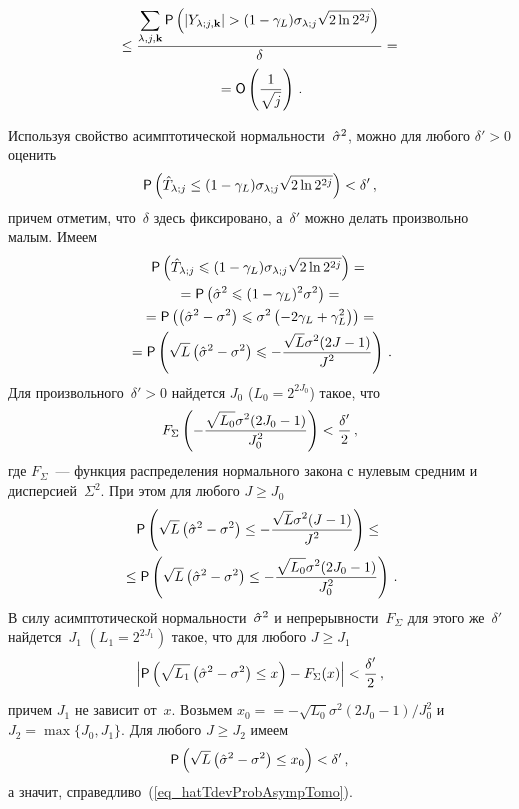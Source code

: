 \begin{multicols}{2}
\noindent
\begin{multline*}
{}\leq \displaystyle\frac{\displaystyle  \sum\limits_{\lambda,j,\mathbf{k}} {\sf P}\left( |Y_{\lambda;j,\mathbf{k}}| > (1-\gamma_L)\sigma_{\lambda;j}\sqrt{2\ln 2^{2j}} \right) \mathstrut}{\displaystyle \delta\mathstrut} = {}\\
{}=\textsf{O}\left( \displaystyle\frac{\displaystyle 1\mathstrut}{\displaystyle \sqrt{j}\mathstrut} \right)\,.
\end{multline*}

Используя свойство асимптотической нормальности~$\hat\sigma^2$, можно для любого $\delta'>0$ оценить
\begin{equation}
\label{eq_hatTdevProbAsympTomo}
{\sf P}\left( \hat T_{\lambda;j} \leq (1-\gamma_L)\sigma_{\lambda;j}\sqrt{2\ln 2^{2j}} \right)< \delta'\,,
\end{equation}
причем отметим, что~$\delta$ здесь фиксировано, а~$\delta'$ можно делать произвольно малым. Имеем
\begin{multline*}
{\sf P}\left(\hat T_{\lambda;j}\leqslant(1-\gamma_L)\sigma_{\lambda;j}\sqrt{2\ln 2^{2j}}\right) ={}\\
{}= {\sf P}\left(\hat\sigma^2\leqslant(1-\gamma_L)^2\sigma^2\right)={}\\
{}= {\sf P}\left( \left(\hat\sigma^2-\sigma^2\right) \leqslant \sigma^2\left(-2\gamma_L+\gamma_L^2\right) \right) ={}\\
{}= {\sf P}\left( \sqrt{L}\left(\hat\sigma^2-\sigma^2\right) \leqslant -\displaystyle\frac{\displaystyle \sqrt{L}\sigma^2(2J-1)\mathstrut}{\displaystyle J^2\mathstrut} \right)\,.
\end{multline*}
Для произвольного~$\delta'>0$ найдется $J_0$ ($L_0=2^{2J_0}$) такое, что
\begin{equation*}
F_\Sigma\left( -\displaystyle\frac{\displaystyle \sqrt{L_0}\sigma^2(2J_0-1 )\mathstrut}{\displaystyle J_0^2\mathstrut} \right) < \displaystyle\frac{\displaystyle \delta'\mathstrut}{\displaystyle 2\mathstrut}\,,
\end{equation*}
где $F_\Sigma$~--- функция распределения нормального закона с нулевым средним и дисперсией~$\Sigma^2$. 
При этом для любого $J\geq J_0$
\begin{multline*}
{\sf P}\left( \sqrt{L}\left(\hat\sigma^2-\sigma^2\right) \leq -\displaystyle\frac{\displaystyle \sqrt{L}\sigma^2(J -1 )\mathstrut}{\displaystyle J^2\mathstrut} \right) \leq{} \\
{}\leq {\sf P}\left( \sqrt{L}\left(\hat\sigma^2-\sigma^2\right) \leq -\displaystyle\frac{\displaystyle \sqrt{L_0}\sigma^2(2J_0 -1 )\mathstrut}{\displaystyle J_0^2\mathstrut}  \right)\,.
\end{multline*}
В силу асимптотической нормальности~$\hat\sigma^2$ и непрерывности~$F_\Sigma$ для этого же~$\delta'$ 
найдется~$J_1$ $\left(L_1=2^{2J_1}\right)$ такое, что для любого $J\geq J_1$
\begin{equation*}
\left| {\sf P}\left( \sqrt{L_1}\left(\hat\sigma^2-\sigma^2\right) \leq x \right) - F_\Sigma(x)\right| < \displaystyle\frac{\displaystyle \delta'\mathstrut}{\displaystyle 2\mathstrut}\,,
\end{equation*}
причем $J_1$ не зависит от~$x$. Возьмем $x_0 =$\linebreak $= -\sqrt{L_0}\sigma^2(2J_0-1)/J_0^2$ и 
$J_2 = \max\{J_0,J_1\}$. Для любого $J\geq J_2$ имеем
\begin{equation*}
{\sf P}\left( \sqrt{L}\left(\hat\sigma^2-\sigma^2\right) \leq x_0 \right) < \delta'\,,
\end{equation*}
а значит, справедливо~(\ref{eq_hatTdevProbAsympTomo}).


\end{multicols}
